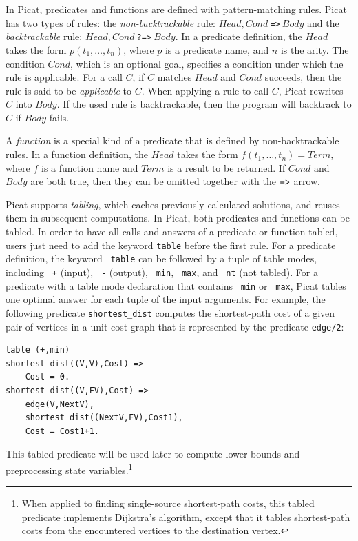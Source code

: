 \documentclass[conference]{IEEEtran}
\begin{document}
In Picat, predicates and functions are defined with pattern-matching rules. Picat has two types of rules: the \emph{non-backtrackable} rule: $Head, Cond\ $\verb+=>+$\ Body$ and the \emph{backtrackable} rule: $Head, Cond\ $\verb+?=>+$\ Body$. In a predicate definition, the $Head$ takes the form $p(t_1,\ldots,t_n)$, where $p$ is a predicate name, and $n$ is the arity. The condition $Cond$, which is an optional goal, specifies a condition under which the rule is applicable. For a call $C$, if $C$ matches $Head$ and $Cond$ succeeds, then the rule is said to be \emph{applicable} to $C$. When applying a rule to call $C$, Picat rewrites $C$ into $Body$. If the used rule is backtrackable, then the program will backtrack to $C$ if $Body$ fails.

A \emph{function} is a special kind of a predicate that is defined by non-backtrackable rules. In a function definition, the $Head$ takes the form $f(t_1,\ldots,t_n) = Term$, where $f$ is a function name and $Term$ is a result to be returned. If $Cond$ and $Body$ are both true, then they can be omitted together with the $\verb+=>+$ arrow.

Picat supports \emph{tabling}, which caches previously calculated solutions, and reuses them in subsequent computations. In Picat, both predicates and functions can be tabled.  In order to have all calls and answers of a predicate or function tabled, users just need to add the keyword \texttt{table} before the first rule. For a predicate definition, the keyword \texttt{ table} can be followed by a tuple of table modes, including \texttt{ +} (input), \texttt{ -} (output), \texttt{ min}, \texttt{ max}, and \texttt{ nt} (not tabled). For a predicate with a table mode declaration that contains \texttt{ min} or \texttt{ max}, Picat tables one optimal answer for each tuple of the input arguments. For example, the following predicate \texttt{shortest\_dist}  computes the shortest-path cost of a given pair of vertices in a unit-cost graph that is represented by the predicate \texttt{edge/2}:

\begin{small}
\begin{verbatim}
table (+,min)
shortest_dist((V,V),Cost) => 
    Cost = 0.
shortest_dist((V,FV),Cost) => 
    edge(V,NextV),
    shortest_dist((NextV,FV),Cost1),
    Cost = Cost1+1.
\end{verbatim}
\end{small}

This tabled predicate will be used later to compute lower bounds and preprocessing state variables.\footnote{When applied to finding single-source shortest-path costs, this tabled predicate implements Dijkstra's algorithm, except that it tables shortest-path costs from the encountered vertices to the destination vertex.}
\end{document}
